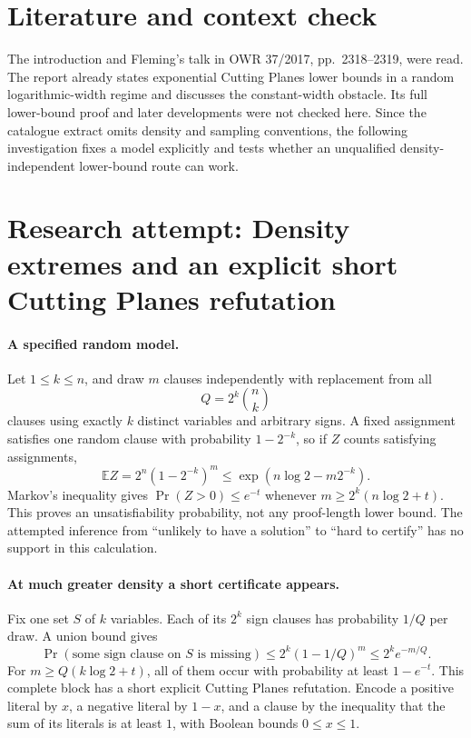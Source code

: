 \documentclass[11pt]{article}
\begin{document}
\section{Literature and context check}
The introduction and Fleming's talk in OWR 37/2017, pp.~2318--2319, were read. The report already states exponential Cutting Planes lower bounds in a random logarithmic-width regime and discusses the constant-width obstacle. Its full lower-bound proof and later developments were not checked here. Since the catalogue extract omits density and sampling conventions, the following investigation fixes a model explicitly and tests whether an unqualified density-independent lower-bound route can work.
\section{Research attempt: Density extremes and an explicit short Cutting Planes refutation}

\paragraph{A specified random model.}
Let $1\le k\le n$, and draw $m$ clauses independently with replacement from all
\[
 Q=2^k\binom nk
\]
clauses using exactly $k$ distinct variables and arbitrary signs. A fixed assignment satisfies one random clause with probability $1-2^{-k}$, so if $Z$ counts satisfying assignments,
\[
 \mathbb EZ=2^n(1-2^{-k})^m\le\exp(n\log2-m2^{-k}).
\]
Markov's inequality gives $\Pr(Z>0)\le e^{-t}$ whenever $m\ge2^k(n\log2+t)$. This proves an unsatisfiability probability, not any proof-length lower bound. The attempted inference from ``unlikely to have a solution'' to ``hard to certify'' has no support in this calculation.

\paragraph{At much greater density a short certificate appears.}
Fix one set $S$ of $k$ variables. Each of its $2^k$ sign clauses has probability $1/Q$ per draw. A union bound gives
\[
 \Pr(\text{some sign clause on }S\text{ is missing})
 \le 2^k(1-1/Q)^m\le 2^k e^{-m/Q}.
\]
For $m\ge Q(k\log2+t)$, all of them occur with probability at least $1-e^{-t}$. This complete block has a short explicit Cutting Planes refutation. Encode a positive literal by $x$, a negative literal by $1-x$, and a clause by the inequality that the sum of its literals is at least $1$, with Boolean bounds $0\le x\le1$.
\end{document}
